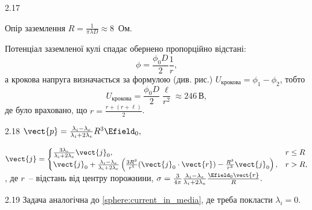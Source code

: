 \begin{Solution}{2.{17}}
\begin{center}
\end{center}
Опір заземлення $R = \frac{1}{\pi\lambda D} \approx 8$~Ом.

Потенціал заземленої кулі спадає обернено пропорційно відстані:
\[
	\phi = \frac{\phi_0 D}{2}\frac{1}{r},
\]
а крокова напруга визначається за формулою (див. рис.) $U_\text{крокова} = \phi_1 - \phi_2$, тобто
\[
	U_\text{крокова} = \frac{\phi_0D}{2}\frac{\ell}{r^2} \approx 246\, \text{В},
\]
де було враховано, що $r = \frac{r + (r + \ell)}{2}$.
\end{Solution}
\begin{Solution}{2.{18}}
	$\vect{p} = \frac{\lambda_i - \lambda_e}{\lambda_i + 2\lambda_e}R^3\Efield_0,$

	$\vect{j} =
		\begin{cases}
			\frac{3\lambda_e}{\lambda_i + 2\lambda_e} \vect{j}_0,                                                                                                    & r \le R \\
			\vect{j}_0  + \frac{\lambda_i - \lambda_e}{\lambda_i + 2\lambda_e} \left( \frac{3R^3}{r^5}(\vect{j}_0\cdot\vect{r}) - \frac{R^3}{r^3}\vect{j}_0\right) , & r > R,
		\end{cases}
	$, де $r$~-- відстань від центру порожнини, $\sigma = \frac{3}{4\pi} \frac{\lambda_i - \lambda_e}{\lambda_i + 2\lambda_e} \frac{\Efield_0\vect{r}}{R}.$
\end{Solution}
\begin{Solution}{2.{19}}
	Задача аналогічна до \ref{sphere:current_in_media}, де треба покласти $\lambda_i = 0$.
\end{Solution}

